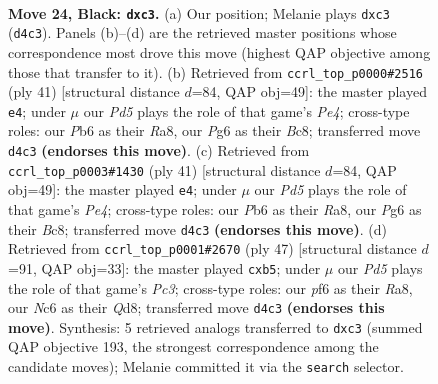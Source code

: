 \documentclass[11pt]{article}
\begin{document}
\clearpage

\begin{figure}[p]\centering
\begin{subfigure}{0.46\textwidth}\centering
\resizebox{\linewidth}{!}{%
\newchessgame
\chessboard[
  setfen={r1b1rk2/3q3p/ppn1pPp1/2p5/P2p1Q2/2P2P2/1P4PP/1KN1RBNR b - - 0 24},
  showmover=false,
  pgfstyle=straightmove, color=movearrow, markmove={d4-c3}
]}
\caption{}
\end{subfigure}\hfill
\begin{subfigure}{0.46\textwidth}\centering
\resizebox{\linewidth}{!}{%
\newchessgame
\chessboard[
  setfen={r1br2k1/1p4p1/2nq3p/p2pp3/P7/2P1RN1P/1P3PP1/RB1Q2K1 b - - 0 21},
  showmover=false,
  pgfstyle=straightmove, color=movearrow, markmove={e5-e4}
]}
\caption{}
\end{subfigure}
\\[4pt]
\begin{subfigure}{0.46\textwidth}\centering
\resizebox{\linewidth}{!}{%
\newchessgame
\chessboard[
  setfen={r1br2k1/1p4p1/2nq3p/p2pp3/P7/2P1RN1P/1P3PP1/RB1Q2K1 b - - 0 21},
  showmover=false,
  pgfstyle=straightmove, color=movearrow, markmove={e5-e4}
]}
\caption{}
\end{subfigure}\hfill
\begin{subfigure}{0.46\textwidth}\centering
\resizebox{\linewidth}{!}{%
\newchessgame
\chessboard[
  setfen={r2qr1k1/5pb1/2p1b2p/pP1p2p1/2nP2P1/2PQ2NP/4PPB1/R1B1R1K1 b - - 0 24},
  showmover=false,
  pgfstyle=straightmove, color=movearrow, markmove={c6-b5}
]}
\caption{}
\end{subfigure}
\caption{\textbf{Move 24, Black: \texttt{dxc3}.} (a) Our position; Melanie plays \texttt{dxc3} (\texttt{d4c3}). Panels (b)--(d) are the retrieved master positions whose correspondence most drove this move (highest QAP objective among those that transfer to it). (b) Retrieved from \texttt{ccrl\_top\_p0000\#2516} (ply 41) [structural distance $d$=84, QAP obj=49]: the master played \texttt{e4}; under $\mu$ our \emph{Pd5} plays the role of that game's \emph{Pe4}; cross-type roles: our \emph{P}b6 as their \emph{R}a8, our \emph{P}g6 as their \emph{B}c8; transferred move \texttt{d4c3} \textbf{(endorses this move)}. (c) Retrieved from \texttt{ccrl\_top\_p0003\#1430} (ply 41) [structural distance $d$=84, QAP obj=49]: the master played \texttt{e4}; under $\mu$ our \emph{Pd5} plays the role of that game's \emph{Pe4}; cross-type roles: our \emph{P}b6 as their \emph{R}a8, our \emph{P}g6 as their \emph{B}c8; transferred move \texttt{d4c3} \textbf{(endorses this move)}. (d) Retrieved from \texttt{ccrl\_top\_p0001\#2670} (ply 47) [structural distance $d$=91, QAP obj=33]: the master played \texttt{cxb5}; under $\mu$ our \emph{Pd5} plays the role of that game's \emph{Pc3}; cross-type roles: our \emph{p}f6 as their \emph{R}a8, our \emph{N}c6 as their \emph{Q}d8; transferred move \texttt{d4c3} \textbf{(endorses this move)}. Synthesis: 5 retrieved analogs transferred to \texttt{dxc3} (summed QAP objective 193, the strongest correspondence among the candidate moves); Melanie committed it via the \texttt{search} selector.}
\label{fig:thought-m47}
\end{figure}
\end{document}
